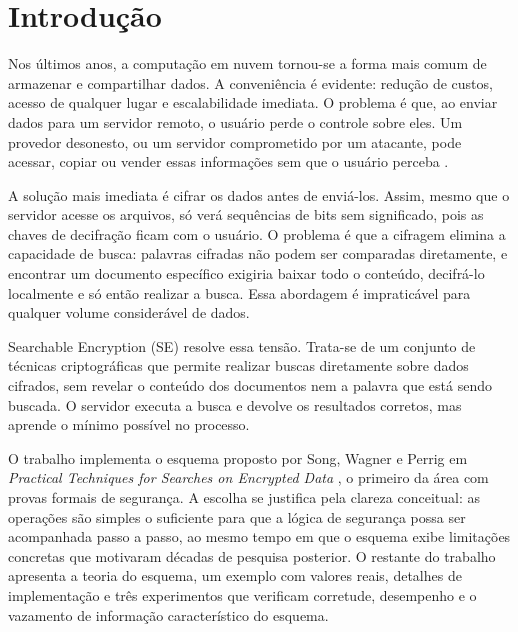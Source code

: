 \documentclass[
  12pt,
  oneside,
  a4paper,
  brazil
]{abntex2}
\begin{document}
\frenchspacing

\imprimircapa
\imprimirfolhaderosto

\tableofcontents*
\cleardoublepage

\chapter{Introdução}

Nos últimos anos, a computação em nuvem tornou-se a forma mais comum
de armazenar e compartilhar dados. A conveniência é evidente: redução
de custos, acesso de qualquer lugar e escalabilidade imediata. O
problema é que, ao enviar dados para um servidor remoto, o usuário
perde o controle sobre eles. Um provedor desonesto, ou um servidor
comprometido por um atacante, pode acessar, copiar ou vender essas
informações sem que o usuário perceba \cite{wang2016}.

A solução mais imediata é cifrar os dados antes de enviá-los. Assim,
mesmo que o servidor acesse os arquivos, só verá sequências de bits
sem significado, pois as chaves de decifração ficam com o usuário. O
problema é que a cifragem elimina a capacidade de busca: palavras
cifradas não podem ser comparadas diretamente, e encontrar um documento
específico exigiria baixar todo o conteúdo, decifrá-lo localmente e
só então realizar a busca. Essa abordagem é impraticável para qualquer
volume considerável de dados.

Searchable Encryption (SE) resolve essa tensão. Trata-se de um
conjunto de técnicas criptográficas que permite realizar buscas
diretamente sobre dados cifrados, sem revelar o conteúdo dos
documentos nem a palavra que está sendo buscada. O servidor executa a
busca e devolve os resultados corretos, mas aprende o mínimo possível
no processo.

O trabalho implementa o esquema proposto por Song, Wagner e Perrig em
\textit{Practical Techniques for Searches on Encrypted Data}
\cite{song2000}, o primeiro da área com provas formais de segurança. A
escolha se justifica pela clareza conceitual: as operações são simples
o suficiente para que a lógica de segurança possa ser acompanhada
passo a passo, ao mesmo tempo em que o esquema exibe limitações
concretas que motivaram décadas de pesquisa posterior. O restante do
trabalho apresenta a teoria do esquema, um exemplo com valores reais,
detalhes de implementação e três experimentos que verificam corretude,
desempenho e o vazamento de informação característico do esquema.
\end{document}
